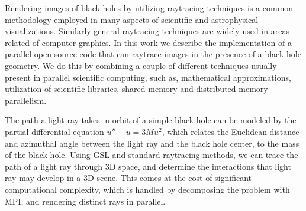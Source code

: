 Rendering images of black holes by utilizing raytracing techniques is a common
methodology employed in many aspects of scientific and astrophysical visualizations.
Similarly general raytracing techniques are widely used in areas related of computer graphics.
In this work we describe the implementation of a parallel open-source code that can raytrace images in the presence of a black hole geometry.
We do this by combining a couple of different techniques usually present in parallel scientific computing,
such as, mathematical approximations, utilization of scientific libraries, shared-memory and distributed-memory parallelism.

The path a light ray takes in orbit of a simple black hole can be modeled by
the partial differential equation $u'' - u = 3Mu^2$, which relates
the Euclidean distance and azimuthal angle between the light ray and the black
hole center, to the mass of the black hole.
Using GSL and standard raytracing methods, we can trace the path of a light ray
through 3D space, and determine the interactions that light ray may develop in a 3D scene.
This comes at the cost of significant computational complexity, which is handled by decomposing
the problem with MPI, and rendering distinct rays in parallel.

